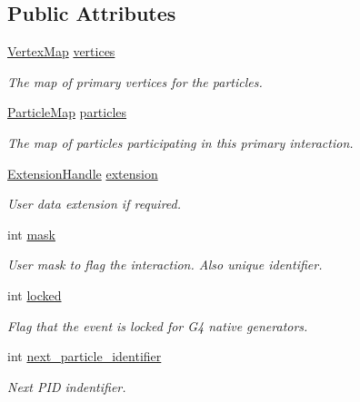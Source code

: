 \subsection*{Public Attributes}
\begin{DoxyCompactItemize}
\item 
\hyperlink{class_d_d4hep_1_1_simulation_1_1_geant4_primary_interaction_a0016a8298291af16ea8f24a054cb864c}{Vertex\+Map} \hyperlink{class_d_d4hep_1_1_simulation_1_1_geant4_primary_interaction_aea4d776147c0e3d0503ee03de54932af}{vertices}
\begin{DoxyCompactList}\small\item\em The map of primary vertices for the particles. \end{DoxyCompactList}\item 
\hyperlink{class_d_d4hep_1_1_simulation_1_1_geant4_primary_interaction_a6787a2c42dc1fd371b274e75dc380e92}{Particle\+Map} \hyperlink{class_d_d4hep_1_1_simulation_1_1_geant4_primary_interaction_af8c7d724dc7792108c26c6fe93d7bf61}{particles}
\begin{DoxyCompactList}\small\item\em The map of particles participating in this primary interaction. \end{DoxyCompactList}\item 
\hyperlink{class_d_d4hep_1_1_simulation_1_1_geant4_primary_interaction_a9d53c6c8fa2e7a6094ba91854af945f4}{Extension\+Handle} \hyperlink{class_d_d4hep_1_1_simulation_1_1_geant4_primary_interaction_a5b906f3249844ff63ea285eb633003d8}{extension}
\begin{DoxyCompactList}\small\item\em User data extension if required. \end{DoxyCompactList}\item 
int \hyperlink{class_d_d4hep_1_1_simulation_1_1_geant4_primary_interaction_a0b4d8c22740846c3d812a13c1048b594}{mask}
\begin{DoxyCompactList}\small\item\em User mask to flag the interaction. Also unique identifier. \end{DoxyCompactList}\item 
int \hyperlink{class_d_d4hep_1_1_simulation_1_1_geant4_primary_interaction_a29b9944b1c56dbbc422320f6bc5a3a85}{locked}
\begin{DoxyCompactList}\small\item\em Flag that the event is locked for G4 native generators. \end{DoxyCompactList}\item 
int \hyperlink{class_d_d4hep_1_1_simulation_1_1_geant4_primary_interaction_a75a39b787b9c354fd958569f316a3023}{next\+\_\+particle\+\_\+identifier}
\begin{DoxyCompactList}\small\item\em Next P\+ID indentifier. \end{DoxyCompactList}\end{DoxyCompactItemize}
